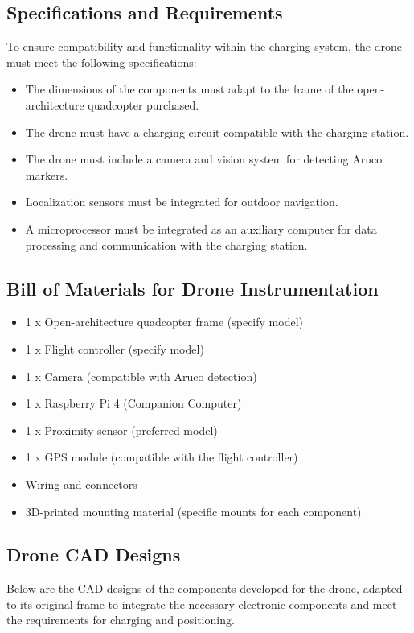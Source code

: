 \subsection{Specifications and Requirements}
To ensure compatibility and functionality within the charging system, the drone must meet the following specifications:
    \begin{itemize}
        \item The dimensions of the components must adapt to the frame of the open-architecture quadcopter purchased.
        \item The drone must have a charging circuit compatible with the charging station.
        \item The drone must include a camera and vision system for detecting Aruco markers.
        \item Localization sensors must be integrated for outdoor navigation.
        \item A microprocessor must be integrated as an auxiliary computer for data processing and communication with the charging station.
    \end{itemize}

\subsection{Bill of Materials for Drone Instrumentation}
    \begin{itemize} 
        \item 1 x Open-architecture quadcopter frame (specify model) 
        \item 1 x Flight controller (specify model) 
        \item 1 x Camera (compatible with Aruco detection) 
        \item 1 x Raspberry Pi 4 (Companion Computer) 
        \item 1 x Proximity sensor (preferred model) 
        \item 1 x GPS module (compatible with the flight controller) 
        \item Wiring and connectors 
        \item 3D-printed mounting material (specific mounts for each component) 
    \end{itemize}


    \subsection{Drone CAD Designs} 
    Below are the CAD designs of the components developed for the drone, adapted to its original frame to integrate the necessary electronic components and meet the requirements for charging and positioning.
    
